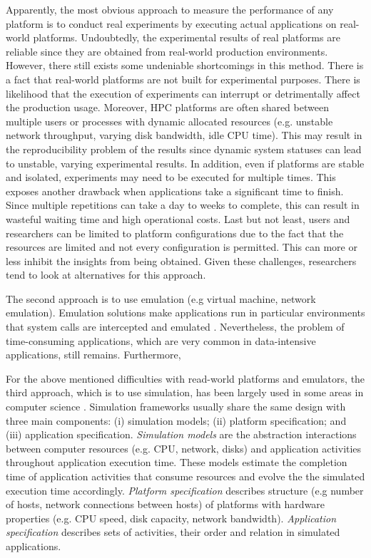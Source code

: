 Apparently, the most obvious approach to measure the performance 
of any platform is to conduct real experiments by executing actual 
applications on real-world platforms. 
Undoubtedly, the experimental results of real platforms are reliable 
since they are obtained from real-world production environments. 
However, there still exists some undeniable shortcomings in this method. 
There is a fact that real-world platforms are not built for 
experimental purposes. 
There is likelihood that the execution of experiments can interrupt 
or detrimentally affect the production usage. 
Moreover, HPC platforms are often shared between multiple users or processes 
with dynamic allocated resources (e.g. unstable network throughput,  
varying disk bandwidth, idle CPU time). 
This may result in the reproducibility problem of the results since 
dynamic system statuses can lead to unstable, varying experimental results. 
In addition, even if platforms are stable and isolated, experiments may need 
to be executed for multiple times. 
This exposes another drawback when applications take a significant time 
to finish. Since multiple repetitions can take a day to weeks to complete, 
this can result in wasteful waiting time and high operational costs.  
Last but not least, users and researchers can be limited to platform 
configurations due to the fact that the resources are limited and 
not every configuration is permitted. This can more or less 
inhibit the insights from being obtained. 
Given these challenges, researchers tend to look at alternatives 
for this approach. 

The second approach is to use emulation (e.g virtual machine, 
network emulation). Emulation solutions make applications run 
in particular environments that system calls are intercepted 
and emulated \cite{casanova2008simgrid}. 
Nevertheless, the problem of time-consuming applications, 
which are very common in data-intensive applications, still remains. 
Furthermore, 

For the above mentioned difficulties with read-world platforms 
and emulators, the third approach, which is to use simulation, has been  
largely used in some areas in computer science \cite{casanova2008simgrid}.  
Simulation frameworks usually share the same design with three main 
components: (i) simulation models; (ii) platform specification; 
and (iii) application specification.
\textit{Simulation models} are the abstraction interactions between computer 
resources (e.g. CPU, network, disks) and application activities throughout 
application execution time. 
These models estimate the completion time of application activities 
that consume resources and evolve the the simulated execution time accordingly.
\textit{Platform specification} describes structure (e.g number of hosts, network
connections between hosts) of platforms with hardware properties 
(e.g. CPU speed, disk capacity, network bandwidth).
\textit{Application specification} describes sets of activities, their order 
and relation in simulated applications.

